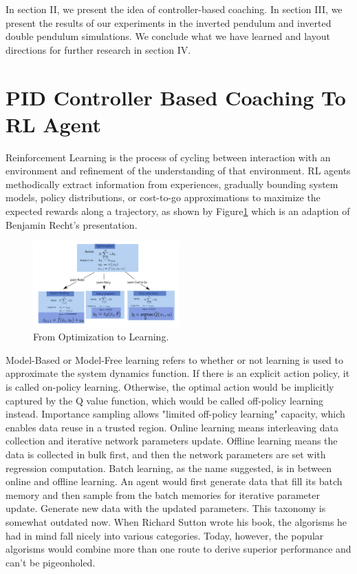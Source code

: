 \documentclass[smallextended]{svjour3}
\begin{document}
In section II, we present the idea of controller-based coaching. In section III, we present the results of our experiments in the inverted pendulum and inverted double pendulum simulations. We conclude what we have learned and layout directions for further research in section IV.

\section{PID Controller Based Coaching To RL Agent}

Reinforcement Learning is the process of cycling between interaction with an environment and refinement of the understanding of that environment. RL agents methodically extract information from experiences, gradually bounding system models, policy distributions, or cost-to-go approximations to maximize the expected rewards along a trajectory, as shown by Figure\ref{fig:rl} which is an adaption of Benjamin Recht's presentation\cite{Recht2018ATO}. 

\begin{figure}[H]
    \centering
    \includegraphics[width=0.5\textwidth]{Control.png}
    \caption{From Optimization to Learning.}
    \label{fig:rl}
\end{figure} 

Model-Based or Model-Free learning refers to whether or not learning is used to approximate the system dynamics function. If there is an explicit action policy, it is called on-policy learning. Otherwise, the optimal action would be implicitly captured by the Q value function, which would be called off-policy learning instead. Importance sampling allows "limited off-policy learning" capacity, which enables data reuse in a trusted region. Online learning means interleaving data collection and iterative network parameters update. Offline learning means the data is collected in bulk first, and then the network parameters are set with regression computation. Batch learning, as the name suggested, is in between online and offline learning. An agent would first generate data that fill its batch memory and then sample from the batch memories for iterative parameter update. Generate new data with the updated parameters. This taxonomy is somewhat outdated now. When Richard Sutton wrote his book\cite{Sutton1998IntroductionTR}, the algorisms he had in mind fall nicely into various categories. Today, however, the popular algorisms would combine more than one route to derive superior performance and can't be pigeonholed.
\end{document}
